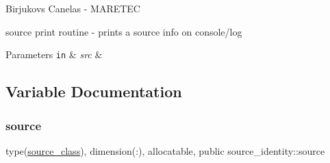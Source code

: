 Birjukovs Canelas -\/ M\+A\+R\+E\+T\+EC 

source print routine -\/ prints a source info on console/log 
\begin{DoxyParams}[1]{Parameters}
\mbox{\tt in}  & {\em src} & \\
\hline
\end{DoxyParams}


\subsection{Variable Documentation}
\mbox{\label{namespacesource__identity_a5ed8006613af7461c6a2ff1cdaeb8f0f}} 
\subsubsection{\texorpdfstring{source}{source}}
{\footnotesize\ttfamily type(\mbox{\hyperlink{structsource__identity_1_1source__class}{source\+\_\+class}}), dimension(\+:), allocatable, public source\+\_\+identity\+::source}

